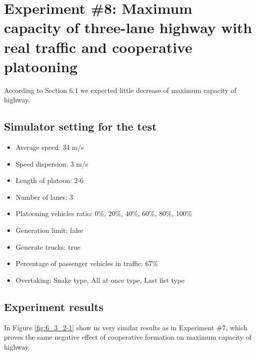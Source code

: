 \newpage
\section[Experiment \#8: Maximum capacity of three-lane highway with real traffic and cooperative platooning]{Experiment \#8: Maximum capacity of three-lane highway with real traffic and cooperative platooning }

According to Section 6.1 we expected little decrease of maximum capacity of highway.


\subsection*{Simulator setting for the test}
\begin{itemize}
\item Average speed: 34 m/s
\item Speed dispersion: 3 m/s
\item Length of platoon: 2-6
\item Number of lanes:  3
\item Platooning vehicles ratio: 0\%, 20\%, 40\%, 60\%, 80\%, 100\%
\item Generation limit: false
\item Generate trucks: true
\item Percentage of passenger vehicles in traffic: 67\%
\item Overtaking: Snake type, All at once type, Last fist type
\end{itemize}



\subsection*{Experiment results}

In Figure \ref{fig:6_3_2-1} show us very similar results as in Experiment \#7, which proves the same negative effect of cooperative formation on maximum capacity of highway.




